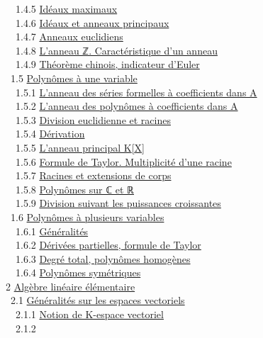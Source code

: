 \documentclass[]{article}
\begin{document}
~~1.4.5 \href{coursse4.html\#x8-310001.4.5}{Idéaux maximaux} \\ ~~1.4.6
\href{coursse4.html\#x8-320001.4.6}{Idéaux et anneaux principaux} \\
~~1.4.7 \href{coursse4.html\#x8-330001.4.7}{Anneaux euclidiens} \\
~~1.4.8 \href{coursse4.html\#x8-340001.4.8}{L'anneau ℤ. Caractéristique
d'un anneau} \\ ~~1.4.9 \href{coursse4.html\#x8-350001.4.9}{Théorème
chinois, indicateur d'Euler} \\ ~1.5
\href{coursse5.html\#x9-360001.5}{Polynômes à une variable} \\ ~~1.5.1
\href{coursse5.html\#x9-370001.5.1}{L'anneau des séries formelles à
coefficients dans A} \\ ~~1.5.2
\href{coursse5.html\#x9-380001.5.2}{L'anneau des polynômes à
coefficients dans A} \\ ~~1.5.3
\href{coursse5.html\#x9-390001.5.3}{Division euclidienne et racines} \\
~~1.5.4 \href{coursse5.html\#x9-400001.5.4}{Dérivation} \\ ~~1.5.5
\href{coursse5.html\#x9-410001.5.5}{L'anneau principal K{[}X{]}} \\
~~1.5.6 \href{coursse5.html\#x9-420001.5.6}{Formule de Taylor.
Multiplicité d'une racine} \\ ~~1.5.7
\href{coursse5.html\#x9-430001.5.7}{Racines et extensions de corps} \\
~~1.5.8 \href{coursse5.html\#x9-440001.5.8}{Polynômes sur ℂ et ℝ} \\
~~1.5.9 \href{coursse5.html\#x9-450001.5.9}{Division suivant les
puissances croissantes} \\ ~1.6
\href{coursse6.html\#x10-460001.6}{Polynômes à plusieurs variables} \\
~~1.6.1 \href{coursse6.html\#x10-470001.6.1}{Généralités} \\ ~~1.6.2
\href{coursse6.html\#x10-480001.6.2}{Dérivées partielles, formule de
Taylor} \\ ~~1.6.3 \href{coursse6.html\#x10-490001.6.3}{Degré total,
polynômes homogènes} \\ ~~1.6.4
\href{coursse6.html\#x10-500001.6.4}{Polynômes symétriques} \\ 2
\href{coursch3.html\#x11-510002}{Algèbre linéaire élémentaire} \\ ~2.1
\href{coursse7.html\#x12-520002.1}{Généralités sur les espaces
vectoriels} \\ ~~2.1.1 \href{coursse7.html\#x12-530002.1.1}{Notion de
K-espace vectoriel} \\ ~~2.1.2
\end{document}
